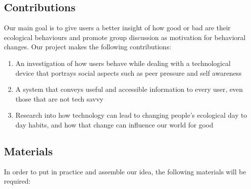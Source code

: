\documentclass{sigchi-ext}
\begin{document}
\subsection{Contributions}
Our main goal is to give users a better insight of how good or bad are their ecological behaviours and promote group discussion as motivation for behavioral changes\cite{toner2014impact,collins2018learning,4076546}.
Our project makes the following contributions:
\begin{enumerate}
  \item An investigation of how users behave while dealing with a technological device that portrays social aspects such as peer pressure and self awareness
  \item A system that conveys useful and accessible information to every user, even those that are not tech savvy
  \item Research into how technology can lead to changing people's ecological day to day habits, and how that change can influence our world for good
\end{enumerate}


\subsection{Materials}
In order to put in practice and assemble our idea, the following materials will be required:
\end{document}
